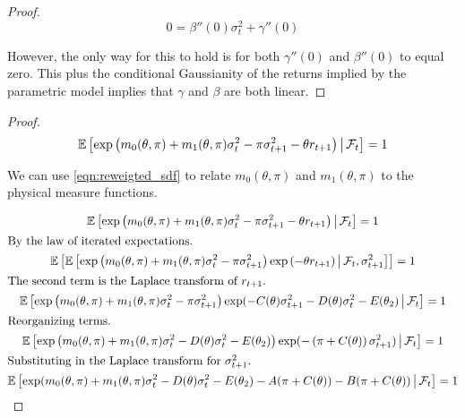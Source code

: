 \documentclass[11pt, letterpaper, twoside]{article}
\begin{document}
\begin{appendices}
\begin{proof}
 \begin{equation}
  0 = \beta''(0) \sigma^2_t + \gamma''(0)
 \end{equation}

 However, the only way for this to hold is for both $\gamma''(0)$ and $\beta''(0)$ to equal zero.
 This plus the conditional Gaussianity of the returns implied by the parametric model implies that $\gamma$
 and $\beta$ are both linear.

\end{proof}


\sdfConstants*

\begin{proof}

\begin{equation}
 \label{eqn:reweigted_sdf}
 \operatorname{\mathbb{E}}\left[\exp\left(m_0(\theta, \pi) + m_1(\theta, \pi) \sigma^2_t - \pi \sigma^2_{t+1} - \theta r_{t+1}
 \right) \,\middle\vert\, \mathcal{F}_t \right] = 1 
\end{equation}

We can use \cref{eqn:reweigted_sdf} to relate $m_0(\theta, \pi)$ and $m_1(\theta, \pi)$ to the physical measure
functions. 

\begin{gather}
 \E\left[\exp\left(m_0(\theta, \pi) + m_1(\theta, \pi) \sigma^2_t - \pi \sigma^2_{t+1} - \theta r_{t+1}
 \right) \mvert \F_t \right] = 1 \\
%
 \intertext{By the law of iterated expectations.}
%
 \E\left[ \E\left[\exp\left(m_0(\theta, \pi) + m_1(\theta, \pi) \sigma^2_t - \pi \sigma^2_{t+1}\right)
  \exp\left( - \theta r_{t+1}\right) \mvert \F_t, \sigma^2_{t+1} \right]\right] = 1 \\
%
 \intertext{The second term is the Laplace transform of $r_{t+1}$.}
%
 \E\left[\exp\left(m_0(\theta, \pi) + m_1(\theta, \pi) \sigma^2_t - \pi \sigma^2_{t+1} \right)
  \exp(-C(\theta) \sigma^2_{t+1} - D(\theta) \sigma^2_{t} - E(\theta_2) \mvert \F_t \right] = 1 \\
%
 \intertext{Reorganizing terms.}
%
 \E\left[\exp\left(m_0(\theta, \pi) + m_1(\theta, \pi) \sigma^2_t - D(\theta) \sigma^2_{t} - E(\theta_2)
 \right) \exp(-\left(\pi + C(\theta)\right) \sigma^2_{t+1}) \mvert \F_t \right] = 1 \\ 
%
 \intertext{Substituting in the Laplace transform for $\sigma^2_{t+1}$.} 
%
 \label{eqn:expected_sdf_wrt_PP}
 \E\left[\exp(m_0(\theta, \pi) + m_1(\theta, \pi) \sigma^2_t - D(\theta) \sigma^2_{t} - E(\theta_2) - A(\pi +
 C(\theta)) - B(\pi + C(\theta)) \mvert \F_t \right] = 1 
\end{gather}


\end{proof}
\end{appendices}
\end{document}
